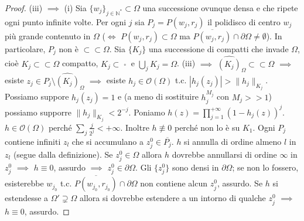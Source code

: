 \begin{proof}
  (iii) $\implies$ (i) Sia $\{w_j\}_{j \in \mathbb{N}^*} \subset \Omega$ una successione ovunque densa e che ripete ogni punto infinite volte. Per ogni $j$ sia $P_j=P(w_j,r_j)$ il polidisco di centro $w_j$ più grande contenuto in $\Omega$ ($\iff$ $P(w_j,r_j) \subset \Omega$ ma $\overline{P(w_j,r_j)}\cap\partial\Omega\not=\emptyset$). In particolare, $P_j$ non è $\subset\subset\Omega$.
  Sia $\{K_j\}$ una successione di compatti che invade $\Omega$, cioè $K_j \subset\subset \Omega$ compatto, $K_j \subset \mathop {K_{j+1}}\limits^ \circ$ e $\displaystyle \bigcup_j K_j=\Omega$.
  (iii) $\implies$ $\widehat{(K_j)}_\Omega \subset\subset \Omega$ $\implies$ esiste $z_j \in P_j\setminus\widehat{(K_j)}_\Omega$ $\implies$ esiste $h_j \in \mathcal{O}(\Omega)$ t.c. $|h_j(z_j)|>\|h_j\|_{K_j}$. Possiamo suppore $h_j(z_j)=1$ e (a meno di sostituire $h_j^{M_j}$ con $M_j>>1$) possiamo supporre $\|h_j\|_{K_j}<2^{-j}$.
  Poniamo $\displaystyle h(z)=\prod_{j=1}^{+\infty} (1-h_j(z))^j$. $h \in \mathcal{O}(\Omega)$ perché $\displaystyle \sum_j \frac{j}{2^j}<+\infty$. Inoltre $h \not\equiv 0$ perché non lo è su $K_1$. Ogni $P_j$ contiene infiniti $z_l$ che si accumulano a $z_j^0 \in \overline{P_j}$.
  $h$ si annulla di ordine almeno $l$ in $z_l$ (segue dalla definizione). Se $z_j^0 \in \Omega$ allora $h$ dovrebbe annullarsi di ordine $\infty$ in $z_j^0$ $\implies$ $h \equiv 0$, assurdo $\implies$ $z_j^0 \in \partial\Omega$.
  Gli $\{z_j^0\}$ sono densi in $\partial\Omega$; se non lo fossero, esisterebbe $w_{j_0}$ t.c. $\overline{P(w_{j_0},r_{j_0})} \cap \partial\Omega$ non contiene alcun $z_j^0$, assurdo. Se $h$ si estendesse a $\Omega' \supsetneq \Omega$ allora si dovrebbe estendere a un intorno di qualche $z_j^0$ $\implies$ $h \equiv 0$, assurdo.


\end{proof}
